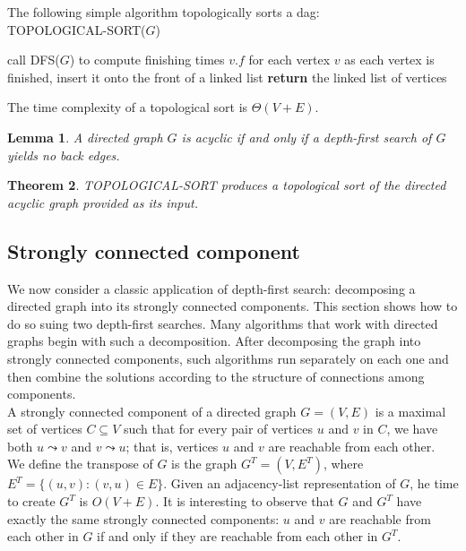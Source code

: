 \documentclass[12pt]{article}
\newtheorem{theorem}{Theorem}
\newtheorem{lemma}[theorem]{Lemma}
\begin{document}
The following simple algorithm topologically sorts a dag: \\

TOPOLOGICAL-SORT($G$)
\begin{algorithmic} [1]
\State call DFS($G$) to compute finishing times $v.f$ for each vertex $v$
\State as each vertex is finished, insert it onto the front of a linked list
\State \textbf{return } the linked list of vertices 
\end{algorithmic}

The time complexity of a topological sort is $\Theta(V+E)$. \\

\begin{lemma}
  A directed graph $G$ is acyclic if and only if a depth-first search of $G$ yields no back edges.
\end{lemma}

\begin{theorem}
  TOPOLOGICAL-SORT produces a topological sort of the directed acyclic graph provided as its input.
\end{theorem}

\subsection{Strongly connected component}

We now consider a classic application of depth-first search: decomposing a directed graph into its strongly connected components. This section shows how to do so suing two depth-first searches. Many algorithms that work with directed graphs begin with such a decomposition. After decomposing the graph into strongly connected components, such algorithms run separately on each one and then combine the solutions according to the structure of connections among components. \\

A strongly connected component of a directed graph $G=(V,E)$ is a maximal set of vertices $C \subseteq V$ such that for every pair of vertices $u$ and $v$ in $C$, we have both $u \leadsto v$ and $v \leadsto u$; that is, vertices $u$ and $v$ are reachable from each other. \\

We define the transpose of $G$ is the graph $G^T = (V,E^T)$, where $E^T = \{(u,v) : (v,u) \in E \}$. Given an adjacency-list representation of $G$, he time to create $G^T$ is $O(V+E)$. It is interesting to observe that $G$ and $G^T$ have exactly the same strongly connected components: $u$ and $v$ are reachable from each other in $G$ if and only if they are reachable from each other in $G^T$. \\
\end{document}
